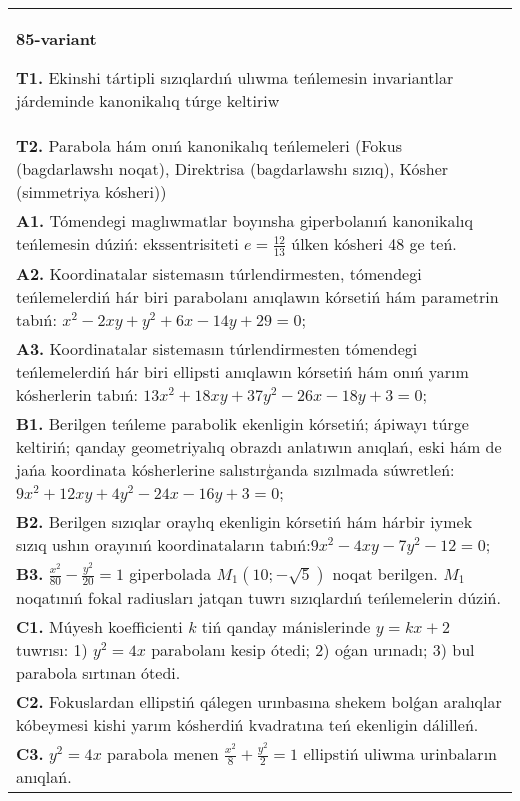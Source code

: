 \documentclass{article}
\begin{document}
\begin{tabular}{m{17cm}}
\textbf{85-variant}
\newline

\textbf{T1.} Ekinshi tártipli sızıqlardıń ulıwma teńlemesin invariantlar járdeminde kanonikalıq túrge keltiriw \\
\textbf{T2.} Parabola hám onıń kanonikalıq teńlemeleri (Fokus (bagdarlawshı noqat), Direktrisa (bagdarlawshı sızıq), Kósher (simmetriya kósheri)) \\
\textbf{A1.} Tómendegi maglıwmatlar boyınsha giperbolanıń kanonikalıq teńlemesin dúziń: ekssentrisiteti $e=\frac{12}{13}$ úlken kósheri 48 ge teń. \\
\textbf{A2.} Koordinatalar sistemasın túrlendirmesten, tómendegi teńlemelerdiń hár biri parabolanı anıqlawın kórsetiń hám parametrin tabıń: $x^2-2 x y+y^2+6 x-14 y+29=0$; \\
\textbf{A3.} Koordinatalar sistemasın túrlendirmesten tómendegi teńlemelerdiń hár biri ellipsti anıqlawın kórsetiń hám onıń yarım kósherlerin tabıń: $13 x^2+18 x y+37 y^2-26 x-18 y+3=0$; \\
\textbf{B1.} Berilgen teńleme parabolik ekenligin kórsetiń; ápiwayı túrge keltiriń; qanday geometriyalıq obrazdı anlatıwın anıqlań, eski hám de jańa koordinata kósherlerine salıstırģanda sızılmada súwretleń:$9 x^2+12 x y+4 y^2-24 x-16 y+3=0$; \\
\textbf{B2.} Berilgen sızıqlar oraylıq ekenligin kórsetiń hám hárbir iymek sızıq ushın orayınıń koordinataların tabıń:$9 x^2-4 x y-7 y^2-12=0$; \\
\textbf{B3.} $\frac{x^2}{80}-\frac{y^2}{20}=1$ giperbolada $M_1 (10;-\sqrt{5}) $ noqat berilgen. $M_1$ noqatınıń fokal radiusları jatqan tuwrı sızıqlardıń teńlemelerin dúziń. \\
\textbf{C1.} Múyesh koefficienti $k$ tiń qanday mánislerinde $y=kx+2$ tuwrısı: 1) $y^2=4x$ parabolanı kesip ótedi; 2) oǵan urınadı; 3) bul parabola sırtınan ótedi. \\
\textbf{C2.} Fokuslardan ellipstiń qálegen urınbasına shekem bolǵan aralıqlar kóbeymesi kishi yarım kósherdiń kvadratına teń ekenligin dálilleń. \\
\textbf{C3.} $y^2=4 x$ parabola menen $\frac{x^2}{8}+\frac{y^2}{2}=1$ ellipstiń uliwma urinbaların anıqlań. \\

\end{tabular}
\vspace{1cm}
\end{document}
